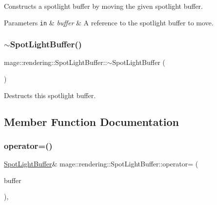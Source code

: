 Constructs a spotlight buffer by moving the given spotlight buffer.


\begin{DoxyParams}[1]{Parameters}
\mbox{\tt in}  & {\em buffer} & A reference to the spotlight buffer to move. \\
\hline
\end{DoxyParams}
\mbox{\label{structmage_1_1rendering_1_1_spot_light_buffer_ab1fecb64be60d395b0bc5d3e6cc4072a}} 
\subsubsection{\texorpdfstring{$\sim$\+Spot\+Light\+Buffer()}{~SpotLightBuffer()}}
{\footnotesize\ttfamily mage\+::rendering\+::\+Spot\+Light\+Buffer\+::$\sim$\+Spot\+Light\+Buffer (\begin{DoxyParamCaption}{ }\end{DoxyParamCaption})\hspace{0.3cm}{\ttfamily [default]}}

Destructs this spotlight buffer. 

\subsection{Member Function Documentation}
\mbox{\label{structmage_1_1rendering_1_1_spot_light_buffer_a6bfd4e7dc9b8a7d3cd5206c9becb91cf}} 
\subsubsection{\texorpdfstring{operator=()}{operator=()}\hspace{0.1cm}{\footnotesize\ttfamily [1/2]}}
{\footnotesize\ttfamily \mbox{\hyperlink{structmage_1_1rendering_1_1_spot_light_buffer}{Spot\+Light\+Buffer}}\& mage\+::rendering\+::\+Spot\+Light\+Buffer\+::operator= (\begin{DoxyParamCaption}\item[{const \mbox{\hyperlink{structmage_1_1rendering_1_1_spot_light_buffer}{Spot\+Light\+Buffer}} \&}]{buffer }\end{DoxyParamCaption})\hspace{0.3cm}{\ttfamily [default]}, {\ttfamily [noexcept]}}

